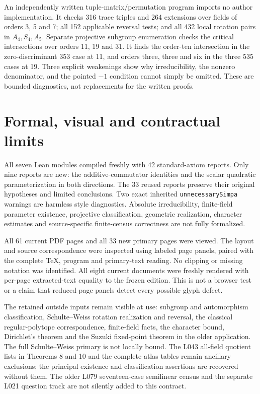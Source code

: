 \documentclass[11pt,a4paper]{article}
\begin{document}
An independently written tuple-matrix/permutation program imports no author
implementation. It checks 316 trace triples and 264 extensions over fields
of orders 3, 5 and 7; all 152 applicable reversal tests; and all 432 local
rotation pairs in $A_4,S_4,A_5$. Separate projective subgroup enumeration
checks the critical intersections over orders 11, 19 and 31. It finds the
order-ten intersection in the zero-discriminant $353$ case at 11, and
orders three, three and six in the three $535$ cases at 19. Three explicit
weakenings show why irreducibility, the nonzero denominator, and the pointed
$-1$ condition cannot simply be omitted. These are bounded diagnostics,
not replacements for the written proofs.

\newpage
\section*{Formal, visual and contractual limits}
All seven Lean modules compiled freshly with 42 standard-axiom reports.
Only nine reports are new: the additive-commutator identities and the scalar
quadratic parameterization in both directions. The 33 reused reports preserve
their original hypotheses and limited conclusions. Two exact inherited
\texttt{unnecessarySimpa} warnings are harmless style diagnostics.
Absolute irreducibility, finite-field parameter existence, projective
classification, geometric realization, character estimates and source-specific
finite-census correctness are not fully formalized.

All 61 current PDF pages and all 33 new primary pages were viewed. The layout
and source correspondence were inspected using labeled page panels, paired
with the complete TeX, program and primary-text reading. No clipping or missing
notation was identified. All eight current documents were freshly rendered
with per-page extracted-text equality to the frozen edition. This is not a
browser test or a claim that reduced page panels detect every possible glyph
defect.

The retained outside inputs remain visible at use: subgroup and automorphism
classification, Schulte--Weiss rotation realization and reversal, the classical
regular-polytope correspondence, finite-field facts, the character bound,
Dirichlet's theorem and the Suzuki fixed-point theorem in the older application.
The full Schulte--Weiss primary is not locally bound. The L043 all-field
quotient lists in Theorems 8 and 10 and the complete atlas tables remain
ancillary exclusions; the principal existence and classification assertions
are recovered without them. The older L079 seventeen-case semilinear census
and the separate L021 question track are not silently added to this contract.
\end{document}
